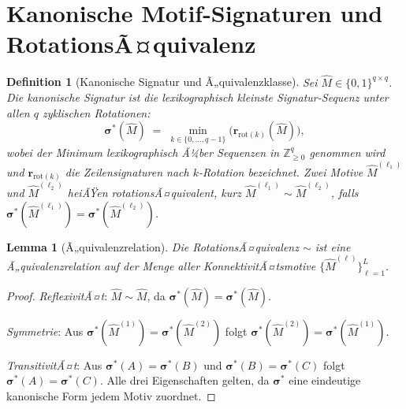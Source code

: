﻿\documentclass[12pt, a4paper, openany]{report}
\newtheorem{lemma}[theorem]{Lemma}
\newtheorem{definition}[theorem]{Definition}
\newcommand{\Z}{\mathbb{Z}}
\begin{document}
\section{Kanonische Motif-Signaturen und RotationsÃ¤quivalenz}
\label{sec:sgkr_signature}

\begin{definition}[Kanonische Signatur und Ã„quivalenzklasse]
\label{def:canonical_sig}
Sei $\hat{M} \in \{0,1\}^{q\times q}$.  Die \emph{kanonische Signatur} ist
die lexikographisch kleinste Signatur-Sequenz unter allen $q$ zyklischen
Rotationen:
\begin{equation}
  \label{eq:canonical}
  \bm{\sigma}^*(\hat{M})
  \;=\; \min_{k \in \{0,\ldots,q-1\}}
  \bigl(\bm{r}_{\mathrm{rot}(k)}(\hat{M})\bigr),
\end{equation}
wobei der Minimum lexikographisch Ã¼ber Sequenzen in $\Z_{\geq 0}^q$
genommen wird und $\bm{r}_{\mathrm{rot}(k)}$ die Zeilensignaturen nach
$k$-Rotation bezeichnet.
Zwei Motive $\hat{M}^{(\ell_1)}$ und $\hat{M}^{(\ell_2)}$ heiÃŸen
\emph{rotations\-Ã¤quivalent}, kurz $\hat{M}^{(\ell_1)} \sim \hat{M}^{(\ell_2)}$,
falls $\bm{\sigma}^*(\hat{M}^{(\ell_1)}) = \bm{\sigma}^*(\hat{M}^{(\ell_2)})$.
\end{definition}

\begin{lemma}[Ã„quivalenzrelation]
\label{lem:equiv_relation}
Die RotationsÃ¤quivalenz $\sim$ ist eine Ã„quivalenzrelation auf der Menge
aller KonnektivitÃ¤tsmotive $\{\hat{M}^{(\ell)}\}_{\ell=1}^{L}$.
\end{lemma}

\begin{proof}
\emph{ReflexivitÃ¤t}: $\hat{M} \sim \hat{M}$, da $\bm{\sigma}^*(\hat{M}) = \bm{\sigma}^*(\hat{M})$.

\emph{Symmetrie}: Aus $\bm{\sigma}^*(\hat{M}^{(1)}) = \bm{\sigma}^*(\hat{M}^{(2)})$
folgt $\bm{\sigma}^*(\hat{M}^{(2)}) = \bm{\sigma}^*(\hat{M}^{(1)})$.

\emph{TransitivitÃ¤t}: Aus $\bm{\sigma}^*(A) = \bm{\sigma}^*(B)$ und
$\bm{\sigma}^*(B) = \bm{\sigma}^*(C)$ folgt $\bm{\sigma}^*(A) = \bm{\sigma}^*(C)$.
Alle drei Eigenschaften gelten, da $\bm{\sigma}^*$ eine eindeutige
kanonische Form jedem Motiv zuordnet.
\end{proof}
\end{document}
